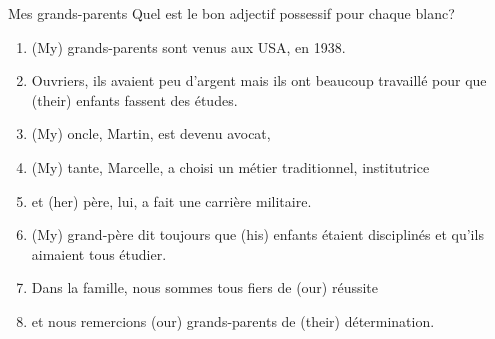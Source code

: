 \begin{frame}{Mes grands-parents}
  Quel est le bon adjectif possessif pour chaque blanc?
  \begin{enumerate}
    \item \underline{} (My) grands-parents sont venus aux USA, en 1938.
    \item Ouvriers, ils avaient peu d'argent mais ils ont beaucoup travaillé pour que \underline{} (their) enfants fassent des études.
    \item \underline{} (My) oncle, Martin, est devenu avocat,
    \item \underline{} (My) tante, Marcelle, a choisi un métier traditionnel, institutrice
    \item et \underline{} (her) père, lui, a fait une carrière militaire.
    \item \underline{} (My) grand-père dit toujours que \underline{} (his) enfants étaient disciplinés et qu'ils aimaient tous étudier.
    \item Dans la famille, nous sommes tous fiers de \underline{} (our) réussite
    \item et nous remercions \underline{} (our) grands-parents de \underline{} (their) détermination.
  \end{enumerate}
\end{frame}